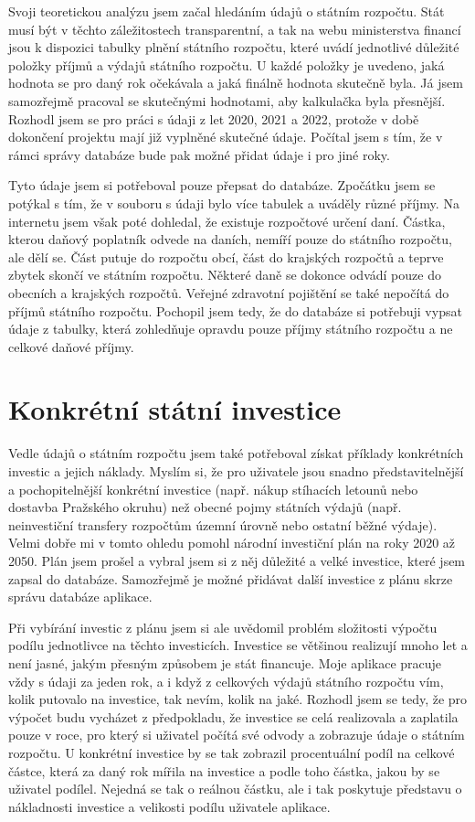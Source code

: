 \documentclass[11pt,a4paper,twoside,openright]{report}
\begin{document}
Svoji teoretickou analýzu jsem začal hledáním údajů o státním rozpočtu. Stát musí být v těchto záležitostech transparentní, a tak na webu ministerstva financí jsou k dispozici tabulky plnění státního rozpočtu, které uvádí jednotlivé důležité položky příjmů a výdajů státního rozpočtu. U každé položky je uvedeno, jaká hodnota se pro daný rok očekávala a jaká finálně hodnota skutečně byla. Já jsem samozřejmě pracoval se skutečnými hodnotami, aby kalkulačka byla přesnější. Rozhodl jsem se pro práci s údaji z let 2020, 2021 a 2022, protože v době dokončení projektu mají již vyplněné skutečné údaje. Počítal jsem s tím, že v rámci správy databáze bude pak možné přidat údaje i pro jiné roky.

Tyto údaje jsem si potřeboval pouze přepsat do databáze. Zpočátku jsem se potýkal s tím, že v souboru s údaji bylo více tabulek a uváděly různé příjmy. Na internetu jsem však poté dohledal, že existuje rozpočtové určení daní. Částka, kterou daňový poplatník odvede na daních, nemíří pouze do státního rozpočtu, ale dělí se. Část putuje do rozpočtu obcí, část do krajských rozpočtů a teprve zbytek skončí ve státním rozpočtu. Některé daně se dokonce odvádí pouze do obecních a krajských rozpočtů. Veřejné zdravotní pojištění se také nepočítá do příjmů státního rozpočtu. Pochopil jsem tedy, že do databáze si potřebuji vypsat údaje z tabulky, která zohledňuje opravdu pouze příjmy státního rozpočtu a ne celkové daňové příjmy.

\section{Konkrétní státní investice}

Vedle údajů o státním rozpočtu jsem také potřeboval získat příklady konkrétních investic a jejich náklady. Myslím si, že pro uživatele jsou snadno představitelnější a pochopitelnější konkrétní investice (např. nákup stíhacích letounů nebo dostavba Pražského okruhu) než obecné pojmy státních výdajů (např. neinvestiční transfery rozpočtům územní úrovně nebo ostatní běžné výdaje). Velmi dobře mi v tomto ohledu pomohl národní investiční plán na roky 2020 až 2050. Plán jsem prošel a vybral jsem si z něj důležité a velké investice, které jsem zapsal do databáze. Samozřejmě je možné přidávat další investice z plánu skrze správu databáze aplikace.

Při vybírání investic z plánu jsem si ale uvědomil problém složitosti výpočtu podílu jednotlivce na těchto investicích. Investice se většinou realizují mnoho let a není jasné, jakým přesným způsobem je stát financuje. Moje aplikace pracuje vždy s údaji za jeden rok, a i když z celkových výdajů státního rozpočtu vím, kolik putovalo na investice, tak nevím, kolik na jaké. Rozhodl jsem se tedy, že pro výpočet budu vycházet z předpokladu, že investice se celá realizovala a zaplatila pouze v roce, pro který si uživatel počítá své odvody a zobrazuje údaje o státním rozpočtu. U konkrétní investice by se tak zobrazil procentuální podíl na celkové částce, která za daný rok mířila na investice a podle toho částka, jakou by se uživatel podílel. Nejedná se tak o reálnou částku, ale i tak poskytuje představu o nákladnosti investice a velikosti podílu uživatele aplikace.
\end{document}
